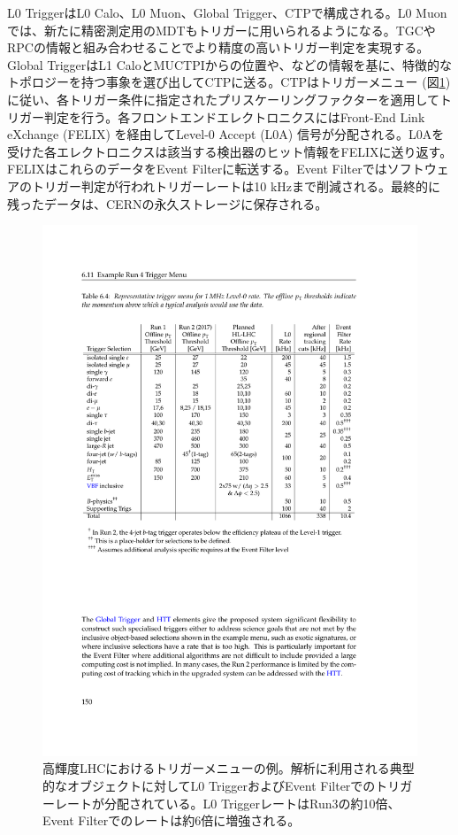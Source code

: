 L0 TriggerはL0 Calo、L0 Muon、Global Trigger、CTPで構成される。L0 Muonでは、新たに精密測定用のMDTもトリガーに用いられるようになる。TGCやRPCの情報と組み合わせることでより精度の高いトリガー判定を実現する。Global TriggerはL1 CaloとMUCTPIからの位置や\pt、\Et などの情報を基に、特徴的なトポロジーを持つ事象を選び出してCTPに送る。CTPはトリガーメニュー (図\ref{Phase2_Triggermenu}) に従い、各トリガー条件に指定されたプリスケーリングファクターを適用してトリガー判定を行う。各フロントエンドエレクトロニクスにはFront-End Link eXchange  (FELIX) を経由してLevel-0 Accept (L0A) 信号が分配される。L0Aを受けた各エレクトロニクスは該当する検出器のヒット情報をFELIXに送り返す。FELIXはこれらのデータをEvent Filterに転送する。Event Filterではソフトウェアのトリガー判定が行われトリガーレートは10 kHzまで削減される。最終的に残ったデータは、CERNの永久ストレージに保存される。

\begin{figure} 
\centering
\includegraphics[width=16cm]{fig/Intro/Phase2_Triggermenu.pdf}
\caption[高輝度LHCにおけるトリガーメニューの例]{高輝度LHCにおけるトリガーメニューの例\cite{tdr_phase2tdaq_2017020}。解析に利用される典型的なオブジェクトに対してL0 TriggerおよびEvent Filterでのトリガーレートが分配されている。L0 TriggerレートはRun3の約10倍、Event Filterでのレートは約6倍に増強される。}
\label{Phase2_Triggermenu}
\end{figure}


